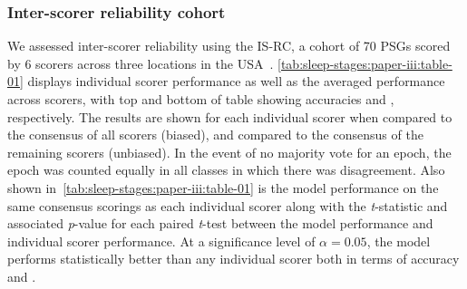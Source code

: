 \subsubsection{Inter-scorer reliability cohort}

We assessed inter-scorer reliability using the \ac{IS-RC}, a cohort of 70 \acp{PSG} scored by 6 scorers across three locations in the USA~\cite{Kuna2013}.
\cref{tab:sleep-stages:paper-iii:table-01} displays individual scorer performance as well as the averaged performance across scorers, with top and bottom of table showing accuracies and \cohen, respectively.
The results are shown for each individual scorer when compared to the consensus of all scorers (biased), and compared to the consensus of the remaining scorers (unbiased).
In the event of no majority vote for an epoch, the epoch was counted equally in all classes in which there was disagreement.
Also shown in~\cref{tab:sleep-stages:paper-iii:table-01} is the model performance on the same consensus scorings as each individual scorer along with the \textit{t}-statistic and associated \textit{p}-value for each paired \textit{t}-test between the model performance and individual scorer performance. 
At a significance level of \(\alpha=0.05\), the model performs statistically better than any individual scorer both in terms of accuracy and \cohen.


